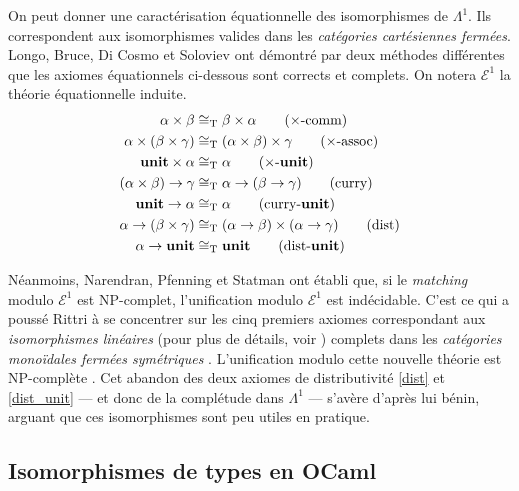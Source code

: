 \documentclass[a4paper]{report}
\theoremstyle{definition}
\newcommand{\unit}{\bold{unit}}
\newcommand{\E}{\mathscr{E}}
\newcommand{\T}{\mathrm{T}}
\begin{document}
On peut donner une caractérisation équationnelle des isomorphismes de $\Lambda^1$. Ils correspondent aux isomorphismes valides dans les \emph{catégories cartésiennes fermées}. Longo, Bruce, Di Cosmo \cite{Bruce_DiCosmo_Longo} et Soloviev \cite{Soloviev83} ont démontré par deux méthodes différentes que les axiomes équationnels ci-dessous sont corrects et complets. On notera $\E^1$ la théorie équationnelle induite.
\begin{align}
    \alpha \times \beta &\cong_\T
    \beta \times \alpha
    \label{prod_comm}
    \tag{$\times$-comm}
  \\
    \alpha \times (\beta \times \gamma) &\cong_\T
    (\alpha \times \beta) \times \gamma
    \label{prod_assoc}
    \tag{$\times$-assoc}
  \\
    \unit \times \alpha &\cong_\T
    \alpha
    \label{prod_unit}
    \tag{$\times$-$\unit$}
  \\
    (\alpha \times \beta) \rightarrow \gamma &\cong_\T
    \alpha \rightarrow (\beta \rightarrow \gamma)
    \label{curry}
    \tag{curry}
  \\
    \unit \rightarrow \alpha &\cong_\T
    \alpha
    \label{curry_unit}
    \tag{curry-$\unit$}
  \\
    \alpha \rightarrow (\beta \times \gamma) &\cong_\T
    (\alpha \rightarrow \beta) \times (\alpha \rightarrow \gamma)
    \label{dist}
    \tag{dist}
  \\
    \alpha \rightarrow \unit &\cong_\T
    \unit
    \label{dist_unit}
    \tag{dist-$\unit$}
\end{align}

Néanmoins, Narendran, Pfenning et Statman \cite{Narendran_Pfenning_Statman} ont établi que, si le \emph{matching} modulo $\E^1$ est NP-complet, l'unification modulo $\E^1$ est indécidable. C'est ce qui a poussé Rittri \cite{Rittri93} à se concentrer sur les cinq premiers axiomes correspondant aux \emph{isomorphismes linéaires} (pour plus de détails, voir \cite{Rittri93}) complets dans les \emph{catégories monoïdales fermées symétriques} \cite{Soloviev93}. L'unification modulo cette nouvelle théorie est NP-complète \cite{Narendran_Pfenning_Statman}. Cet abandon des deux axiomes de distributivité \eqref{dist} et \eqref{dist_unit} — et donc de la complétude dans $\Lambda^1$ — s'avère d'après lui bénin, arguant que ces isomorphismes sont peu utiles en pratique.


\subsection{Isomorphismes de types en OCaml}
\end{document}
